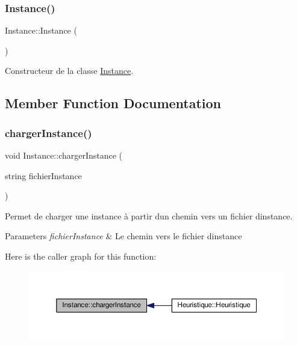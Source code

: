 \subsubsection{\texorpdfstring{Instance()}{Instance()}}
{\footnotesize\ttfamily Instance\+::\+Instance (\begin{DoxyParamCaption}{ }\end{DoxyParamCaption})}



Constructeur de la classe \hyperlink{classInstance}{Instance}. 



\subsection{Member Function Documentation}
\mbox{\label{classInstance_aa64eca6a12ffa8ffc850ac4e04f268fb}} 
\subsubsection{\texorpdfstring{charger\+Instance()}{chargerInstance()}}
{\footnotesize\ttfamily void Instance\+::charger\+Instance (\begin{DoxyParamCaption}\item[{string}]{fichier\+Instance }\end{DoxyParamCaption})}



Permet de charger une instance à partir d\textquotesingle{}un chemin vers un fichier d\textquotesingle{}instance. 


\begin{DoxyParams}{Parameters}
{\em fichier\+Instance} & Le chemin vers le fichier d\textquotesingle{}instance \\
\hline
\end{DoxyParams}
Here is the caller graph for this function\+:\nopagebreak
\begin{figure}[H]
\begin{center}
\leavevmode
\includegraphics[width=350pt]{classInstance_aa64eca6a12ffa8ffc850ac4e04f268fb_icgraph}
\end{center}
\end{figure}
\mbox{\label{classInstance_a5dac330671540cf94e87b7586cd3102e}} 
